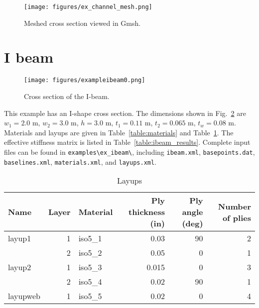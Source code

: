 \documentclass{book}
\begin{document}
\begin{figure}[h]
  \centerline{\texttt{[image: figures/ex\_channel\_mesh.png]}}
  \caption{Meshed cross section viewed in Gmsh.}
  \label{fig:channel_mesh}
\end{figure}



\clearpage
\section{I beam}
\label{eg:ibeam}

\begin{figure}[h]
  \centerline{\texttt{[image: figures/exampleibeam0.png]}}
  \caption{Cross section of the I-beam.}
  \label{fig:ibeam_draw}
\end{figure}

This example has an I-shape cross section. The dimensions shown in 
Fig.~\ref{fig:ibeam_draw} are $w_1=2.0$ m, $w_2=3.0$ m, $h=3.0$ m, 
$t_1=0.11$ m, $t_2=0.065$ m, $t_w=0.08$ m. Materials and layups are 
given in Table~\ref{table:materials} and Table~\ref{table:ibeam_layups}. 
The effective stiffness matrix is listed in Table~\ref{table:ibeam_results}.
Complete input files can be found in \lstinline{examples\ex_ibeam\}, 
including \lstinline{ibeam.xml}, \lstinline{basepoints.dat}, 
\lstinline{baselines.xml}, \lstinline{materials.xml}, and \lstinline{layups.xml}.

\begin{table}[h]
  \centering
  \caption{Layups}
  \begin{tabular}{lrlrrr}
    \toprule
    Name & Layer & Material & Ply thickness (in) & Ply angle (deg) & Number of plies \\
    \midrule
    layup1 & 1 & iso5\_1 & 0.03 & 90 & 2 \\
           & 2 & iso5\_2 & 0.05 &  0 & 1 \\
    layup2 & 1 & iso5\_3 & 0.015 &  0 & 3 \\
           & 2 & iso5\_4 & 0.02  & 90 & 1 \\
    layupweb & 1 & iso5\_5 & 0.02  &  0 & 4 \\
    \bottomrule
  \end{tabular}
  \label{table:ibeam_layups}
\end{table}
\end{document}
